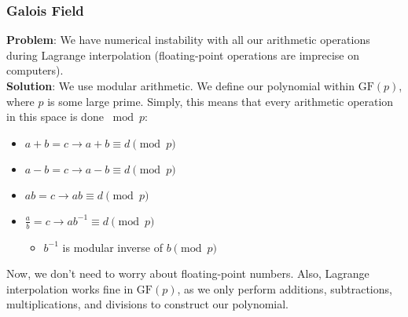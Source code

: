 \documentclass{beamer}
\begin{document}
\begin{frame}
    \frametitle{Galois Field}
    {\bf Problem}: We have numerical instability with all our arithmetic operations during Lagrange interpolation (floating-point operations are imprecise on computers).\\
    {\bf Solution}: We use modular arithmetic. We define our polynomial within $\text{GF}(p)$, where $p$ is some large prime. Simply, this means that every arithmetic operation in this space is done $\bmod p$:
    \begin{itemize}
        \item $a+b=c\rightarrow a+b\equiv d\pmod p$
        \item $a-b=c\rightarrow a-b\equiv d\pmod p$
        \item $ab=c\rightarrow ab\equiv d\pmod p$
        \item $\frac{a}{b}=c\rightarrow ab^{-1}\equiv d\pmod p$
        \begin{itemize}
            \item $b^{-1}$ is modular inverse of $b\pmod p$
        \end{itemize}
    \end{itemize}
    Now, we don't need to worry about floating-point numbers. Also, Lagrange interpolation works fine in $\text{GF}(p)$, as we only perform additions, subtractions, multiplications, and divisions to construct our polynomial.
\end{frame}
\end{document}
